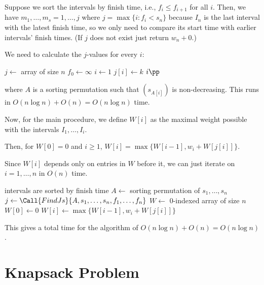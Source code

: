Suppose we sort the intervals by finish time, i.e., $f_i \leq f_{i+1}$ for all $i$.
Then, we have $m_1,\dotsc,m_s = 1,\dotsc,j$ where $j = \max\{ i : f_i < s_n \}$
because $I_n$ is the last interval with the latest finish time,
so we only need to compare its start time with earlier intervals' finish times.
(If $j$ does not exist just return $w_n + 0$.)

We need to calculate the $j$-values for every $i$:
\begin{algorithm}[H]
  \caption{}
  \begin{algorithmic}[1]
    \State $j \gets$ array of size $n$
    \State $f_0 \gets \infty$
    \State $i \gets 1$
    \State $j[i] \gets k$
    \State $i\pp$
    \EndWhile
    \EndFor
    \State {}
  \end{algorithmic}
\end{algorithm}
where $A$ is a sorting permutation such that $(s_{A[i]})$ is non-decreasing.
This runs in $O(n\log n) + O(n) = O(n\log n)$ time.

Now, for the main procedure, we define $W[i]$ as the maximal weight
possible with the intervals $I_1,\dotsc,I_i$.

Then, for $W[0] = 0$ and $i \geq 1$, $W[i] = \max\{W[i-1], w_i + W[j[i]]\}$.

Since $W[i]$ depends only on entries in $W$ before it,
we can just iterate on $i = 1,\dotsc,n$ in $O(n)$ time.

\begin{algorithm}[H]
  \caption{}
  \begin{algorithmic}[1]
    \Require intervals are sorted by finish time
    \State $A \gets$ sorting permutation of $s_1,\dotsc,s_n$
    \State $j \gets \Call{FindJs}{A,s_1,\dotsc,s_n,f_1,\dotsc,f_n}$
    \State $W \gets$ 0-indexed array of size $n$
    \State $W[0] \gets 0$
    \State $W[i] \gets \max\{W[i-1], w_i + W[j[i]]\}$
    \EndFor
    \State {}
  \end{algorithmic}
\end{algorithm}

This gives a total time for the algorithm of $O(n\log n) + O(n) = O(n\log n)$.

\section{Knapsack Problem}

